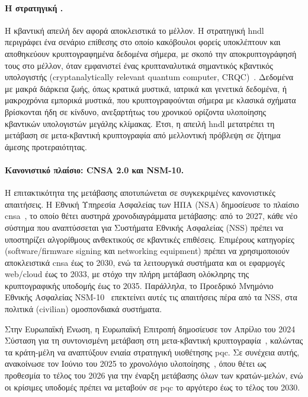 \paragraph{Η στρατηγική .}
Η κβαντική απειλή δεν αφορά αποκλειστικά το μέλλον. Η στρατηγική
\gls{hndl} περιγράφει ένα σενάριο επίθεσης στο
οποίο κακόβουλοι φορείς υποκλέπτουν και αποθηκεύουν κρυπτογραφημένα δεδομένα σήμερα, με
σκοπό την αποκρυπτογράφησή τους στο μέλλον, όταν εμφανιστεί ένας κρυπταναλυτικά σημαντικός κβαντικός υπολογιστής
(cryptanalytically relevant quantum computer, CRQC)~\cite{NSM10-2022}.
Δεδομένα με μακρά διάρκεια ζωής, όπως κρατικά μυστικά, ιατρικά και γενετικά
δεδομένα, ή μακροχρόνια εμπορικά μυστικά, που
κρυπτογραφούνται σήμερα με κλασικά σχήματα βρίσκονται ήδη σε κίνδυνο, ανεξαρτήτως του χρονικού ορίζοντα υλοποίησης κβαντικών υπολογιστών
μεγάλης κλίμακας. Έτσι, η απειλή \gls{hndl} μετατρέπει τη μετάβαση σε μετα-κβαντική
κρυπτογραφία από μελλοντική πρόβλεψη σε ζήτημα άμεσης προτεραιότητας.

\paragraph{Κανονιστικό πλαίσιο: CNSA 2.0 και NSM-10.}
Η επιτακτικότητα της μετάβασης αποτυπώνεται σε συγκεκριμένες κανονιστικές
απαιτήσεις. Η Εθνική Υπηρεσία Ασφαλείας των ΗΠΑ (NSA) δημοσίευσε το πλαίσιο
\gls{cnsa}~\cite{NSA-CNSA2}, το οποίο θέτει αυστηρά χρονοδιαγράμματα μετάβασης: από
το 2027, κάθε νέο σύστημα που αναπτύσσεται για Συστήματα Εθνικής
Ασφαλείας (NSS) πρέπει να
υποστηρίζει αλγορίθμους ανθεκτικούς σε κβαντικές επιθέσεις. Επιμέρους
κατηγορίες (software/firmware signing και networking equipment) πρέπει να
χρησιμοποιούν αποκλειστικά \gls{cnsa} έως το 2030, ενώ τα λειτουργικά συστήματα
και οι εφαρμογές web/cloud έως το 2033, με στόχο την πλήρη μετάβαση ολόκληρης
της κρυπτογραφικής υποδομής έως το 2035. Παράλληλα, το
Προεδρικό Μνημόνιο Εθνικής Ασφαλείας NSM-10~\cite{NSM10-2022} επεκτείνει αυτές
τις απαιτήσεις πέρα από τα NSS, στα πολιτικά (civilian) ομοσπονδιακά συστήματα.

Στην Ευρωπαϊκή Ένωση, η Ευρωπαϊκή Επιτροπή δημοσίευσε τον Απρίλιο του 2024
Σύσταση για τη συντονισμένη μετάβαση στη μετα-κβαντική
κρυπτογραφία~\cite{EC-PQC-Recommendation-2024}, καλώντας τα κράτη-μέλη να
αναπτύξουν ενιαία στρατηγική υιοθέτησης \gls{pqc}. Σε συνέχεια αυτής, ανακοίνωσε 
τον Ιούνιο του 2025 το χρονολόγιο
υλοποίησης~\cite{EC-PQC-Roadmap-2025}, όπου θέτει ως προθεσμία το τέλος
του 2026 για την έναρξη μετάβασης όλων των κρατών-μελών, ενώ οι κρίσιμες
υποδομές πρέπει να μεταβούν σε \gls{pqc} το αργότερο έως το τέλος του 2030.

